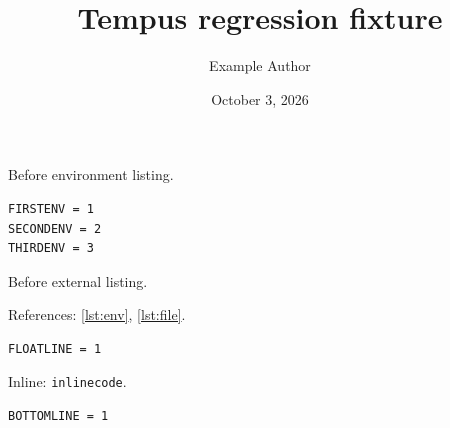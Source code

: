 \documentclass[listings]{tempusreport}
\title{Tempus regression fixture}
\author{Example Author}\date{October 3, 2026}
\begin{document}
\maketitle
\clearpage
\noindent Before environment listing.\par
\vspace*{\dimexpr\textheight-70pt\relax}
\begin{lstlisting}[caption={CAPENV: A deliberately multiline caption describing the near-bottom listing and its first two code lines, which must remain on the same page despite insufficient space on the preceding page.},label={lst:env}]
FIRSTENV = 1
SECONDENV = 2
THIRDENV = 3
\end{lstlisting}
\clearpage
\noindent Before external listing.\par
\vspace*{\dimexpr\textheight-70pt\relax}

\clearpage
\lstlistoflistings
References: \ref{lst:env}, \ref{lst:file}.
\begin{lstlisting}[float=htbp,caption={Floating listing.},label={lst:float}]
FLOATLINE = 1
\end{lstlisting}
Inline: \lstinline|inlinecode|.
\begin{lstlisting}[captionpos=b,caption={Bottom caption.}]
BOTTOMLINE = 1
\end{lstlisting}
\end{document}
